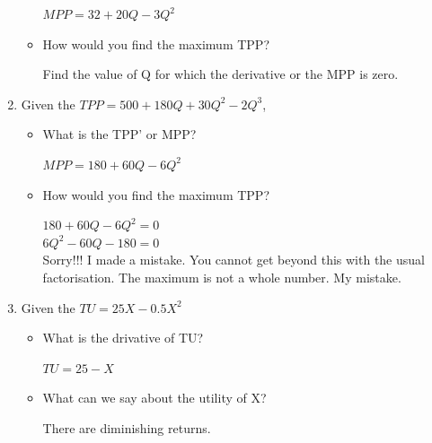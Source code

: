 \documentclass[12pt, a4paper, oneside]{article}\usepackage[]{graphicx}\usepackage[]{color}
\begin{document}
\begin{enumerate}
\begin{itemize}
$MPP = 32 +20Q - 3Q^2$

\item How would you find the maximum TPP?

Find the value of Q for which the derivative or the MPP is zero. 
\end{itemize}

\item Given the $TPP = 500 + 180Q + 30Q^2 - 2Q^3$, 
\begin{itemize}
\item What is the TPP' or MPP?

$MPP = 180 +60Q -6Q^2$

\item How would you find the maximum TPP?

$180 +60Q -6Q^2 = 0$\\
$6Q^2 -60Q -180 = 0$\\

Sorry!!!   I made a mistake.  You cannot get beyond this with the usual factorisation.  The maximum is not a whole number.  My mistake.  

\end{itemize}


\item Given the $TU = 25X - 0.5X^2$
\begin{itemize}
\item What is the drivative of TU?

$TU = 25 - X$

\item What can we say about the utility of X?

There are diminishing returns. 

\end{itemize}



\end{enumerate}
\end{document}
